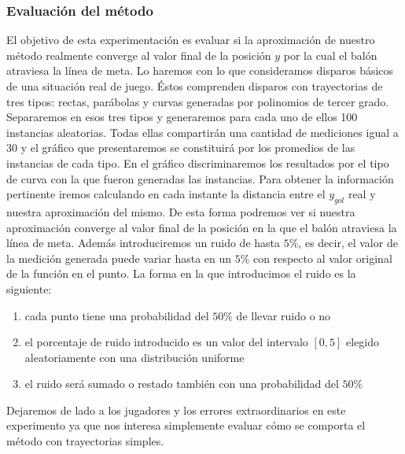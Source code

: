 \subsubsection{Evaluación del método}
El objetivo de esta experimentación es evaluar si la aproximación de nuestro método realmente converge al valor final de 
la posición $y$ por la cual el balón atraviesa la línea de meta. Lo haremos con lo que consideramos disparos básicos de una situación
real de juego. Éstos comprenden disparos con trayectorias de tres tipos: rectas, parábolas y curvas generadas por polinomios de tercer
grado. Separaremos en esos tres tipos y generaremos para cada uno de ellos 100 instancias aleatorias. Todas ellas compartirán 
una cantidad de mediciones igual a 30 y el gráfico que presentaremos se constituirá por los promedios de las instancias de cada tipo.
En el gráfico discriminaremos los resultados por el tipo de curva con la que fueron generadas las instancias. 
Para obtener la información pertinente iremos calculando en cada instante la distancia entre 
el $y_{gol}$ real y nuestra aproximación del mismo. De esta forma podremos ver si nuestra aproximación converge al valor final de 
la posición en la que el balón atraviesa la línea de meta.
Además introduciremos un ruido de hasta $5\%$, es decir, el valor de la medición generada puede variar hasta en un $5\%$ con 
respecto al valor original de la función en el punto. La forma en la que introducimos el ruido es la siguiente:
\begin{enumerate}
	\item cada punto tiene una probabilidad del $50\%$ de llevar ruido o no
	\item el porcentaje de ruido introducido es un valor del intervalo $[0, 5]$ elegido aleatoriamente con una distribución uniforme
	\item el ruido será sumado o restado también con una probabilidad del $50\%$
\end{enumerate}
Dejaremos de lado a los jugadores y los errores extraordinarios en este experimento ya que nos interesa simplemente evaluar cómo se 
comporta el método con trayectorias simples.  


